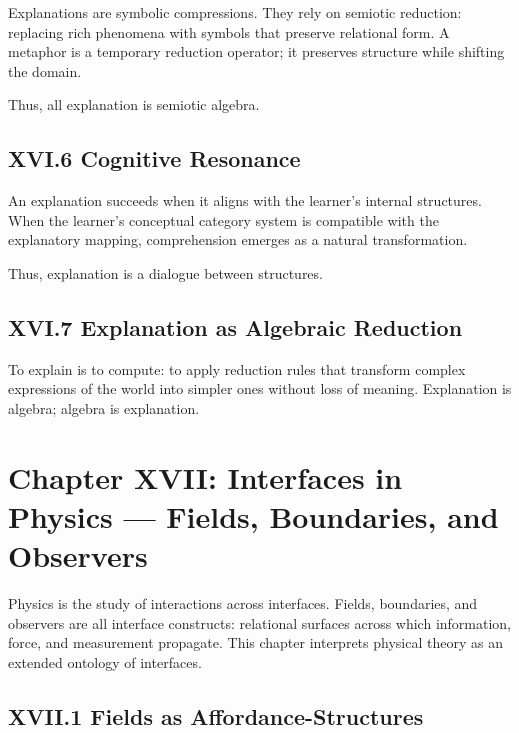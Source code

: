 \documentclass[12pt,letterpaper]{article}
\begin{document}
Explanations are symbolic compressions. They rely on semiotic reduction: replacing rich phenomena with symbols that preserve relational form. A metaphor is a temporary reduction operator; it preserves structure while shifting the domain.

Thus, all explanation is semiotic algebra.

\subsection{XVI.6 Cognitive Resonance}

An explanation succeeds when it aligns with the learner’s internal structures. When the learner’s conceptual category system is compatible with the explanatory mapping, comprehension emerges as a natural transformation.

Thus, explanation is a dialogue between structures.

\subsection{XVI.7 Explanation as Algebraic Reduction}

To explain is to compute: to apply reduction rules that transform complex expressions of the world into simpler ones without loss of meaning. Explanation is algebra; algebra is explanation.

\newpage

\section{Chapter XVII: Interfaces in Physics — Fields, Boundaries, and Observers}

Physics is the study of interactions across interfaces. Fields, boundaries, and observers are all interface constructs: relational surfaces across which information, force, and measurement propagate. This chapter interprets physical theory as an extended ontology of interfaces.

\subsection{XVII.1 Fields as Affordance-Structures}
\end{document}
